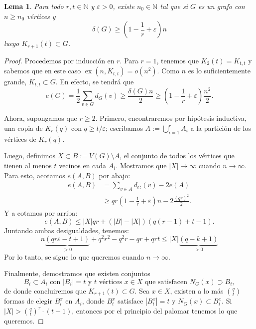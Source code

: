 \documentclass[12pt]{report}
\theoremstyle{plain}
\newtheorem{lemma}[theorem]{Lema}
\theoremstyle{definition}
\newcommand{\naturals}{\mathbb{N}}
\newcommand{\abs}[1]{\left \vert #1 \right \vert}
\newcommand{\ex}[2]{\operatorname{ex} (#1, #2)}
\begin{document}
\begin{lemma}\label{lema:erdos-stone lema 2}
Para todo $r, t \in \naturals$ y $\varepsilon > 0$, existe $n_0 \in \naturals$ tal que si $G$ es un grafo con $n \geq n_0$ vértices y
\[
    \delta (G) \geq \left ( 1 - \frac 1 r + \varepsilon \right ) n
\]
luego $K_{r+1} (t) \subset G$.
\end{lemma}
\begin{proof}
Procedemos por inducción en $r$. Para $r = 1$, tenemos que $K_2 (t) = K_{t,t}$ y sabemos que en este caso $\ex n {K_{t,t}} = o (n^2)$. Como $n$ es lo suficientemente grande, $K_{t,t} \subset G$. En efecto, se tendrá que
\[
    e(G) = \frac 1 2 \sum_{v \in G} d_G (v ) \geq \frac{\delta (G) n}{2} \geq \left (1 - \frac 1 r + \varepsilon \right ) \frac{n^2}{2}.
\]


Ahora, supongamos que $r \geq 2$. Primero, encontraremos por hipótesis inductiva, una copia de $K_{r} (q)$ con $q \geq t/\varepsilon$; escribamos $A := \bigcup_{i = 1}^r A_i$ a la partición de los vértices de $K_r (q)$.

Luego, definimos $X \subset B := V(G) \setminus A$, el conjunto de todos los vértices que tienen al menos $t$ vecinos en cada $A_i$. Mostramos que $\abs X \to \infty$ cuando $n \to \infty$. Para esto, acotamos $e(A,B)$ por abajo:
\begin{align*}
    e(A,B) &= \sum_{v \in A}  d_G (v) - 2 e(A) \\
        &\geq q r  \left (1 - \frac 1 r + \varepsilon \right )n - 2 \frac{(q r)^2}{2}.
\end{align*}
Y a cotamos por arriba:
\[
    e(A,B) \leq \abs X  q r + ( \abs B - \abs X) ( q (r-1) + t - 1).
\]
Juntando ambas desigualdades, tenemos:
\[
    n\underbrace{(q r \varepsilon - t  + 1)}_{>0} + q^2 r^2 - q^2 r - q r + q r t \leq \abs X \underbrace{( q - k +1)}_{> 0}
\]
Por lo tanto, se sigue lo que queremos cuando $n \to \infty$.

Finalmente, demostramos que existen conjuntos
\[
    B_i \subset A_i \text{ con } \abs {B_i} = t \text{ y $t$ vértices $x \in X$ que satisfacen } N_G (x) \supset B_i,
\]
de donde concluiremos que $K_{r+1} (t) \subset G$.
Sea $x \in X$, existen a lo más $\binom q t$ formas de elegir $B_i^x$ en $A_i$, donde $B_i^x$ satisface $\abs{B_i^x} = t$ y $N_G (x) \subset B_i^x$. Si $\abs X > \binom q t ^r \cdot (t-1)$, entonces por el principio del palomar tenemos lo que queremos.
\end{proof}
\end{document}
